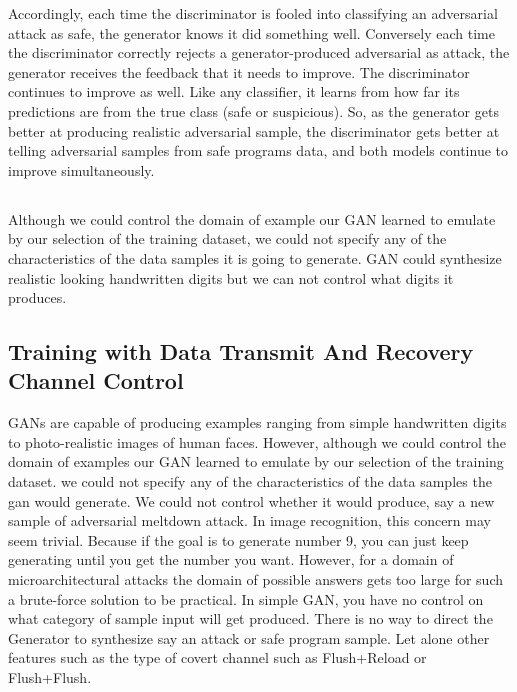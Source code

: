  
Accordingly, each time the discriminator is fooled into classifying an adversarial attack as safe, the generator knows it did something well. Conversely each time the discriminator correctly rejects a generator-produced adversarial as attack, the generator receives the feedback that it needs to improve.
The discriminator continues to improve as well. Like any classifier, it learns from how far its predictions are from the true class (safe or suspicious). So, as the generator gets better at producing realistic adversarial sample, the discriminator gets better at telling adversarial samples from safe programs data, and both models continue to improve simultaneously.



\subsection{}


Although we could control the domain of example our GAN learned to emulate by our selection of the training dataset, we could not specify any of the characteristics of the data samples it is going to generate. GAN could synthesize realistic looking handwritten digits but we can not control what digits it produces.




 \subsection{Training with Data Transmit And Recovery Channel Control}
 GANs are capable of producing examples ranging from simple handwritten digits to photo-realistic images of human faces. However, although we could control the domain of examples our GAN learned to emulate by our selection of the training dataset. we could not specify any of the characteristics of the data samples the gan would generate. We could not control whether it would produce, say a new sample of adversarial meltdown attack. In image recognition, this concern may seem trivial. Because if the goal is to generate number 9, you can just keep generating until you get the number you want. However, for a domain of microarchitectural attacks the domain of possible answers gets too large for such a brute-force solution to be practical. In simple GAN, you have no control on what category of sample input will get produced. There is no way to direct the Generator to synthesize say an attack or safe program sample. Let alone other features such as the type of covert channel such as Flush+Reload or Flush+Flush.
 
